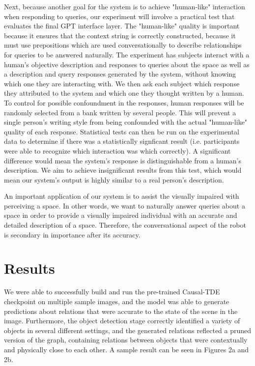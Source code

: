 \documentclass[letterpaper, 10 pt, conference]{ieeeconf}  %
\begin{document}
    Next, because another goal for the system is to achieve "human-like" interaction when responding to queries, our experiment will involve a practical test that evaluates the final GPT interface layer. The "human-like" quality is important because it ensures that the context string is correctly constructed, because it must use prepositions which are used conversationally to describe relationships for queries to be answered naturally. The experiment has subjects interact with a human's objective description and responses to queries about the space as well as a description and query responses generated by the system, without knowing which one they are interacting with. We then ask each subject which response they attributed to the system and which one they thought written by a human. To control for possible confoundment in the responses, human responses will be randomly selected from a bank written by several people. This will prevent a single person's writing style from being confounded with the actual "human-like" quality of each response. Statistical tests can then be run on the experimental data to determine if there was a statistically signficant result (i.e. participants were able to recognize which interaction was which correctly). A significant difference would mean the system's response is distinguishable from a human's description. We aim to achieve insignificant results from this test, which would mean our system's output is highly similar to a real person's description.

    An important application of our system is to assist the visually impaired with perceiving a space. In other words, we want to naturally answer queries about a space in order to provide a visually impaired individual with an accurate and detailed description of a space. Therefore, the conversational aspect of the robot is secondary in importance after its accuracy.


\section{Results}
    We were able to successfully build and run the pre-trained Causal-TDE checkpoint on multiple sample images, and the model was able to generate predictions about relations that were accurate to the state of the scene in the image. Furthermore, the object detection stage correctly identified a variety of objects in several different settings, and the generated relations reflected a pruned version of the graph, containing relations between objects that were contextually and physically close to each other. A sample result can be seen in Figures 2a and 2b.
\end{document}
